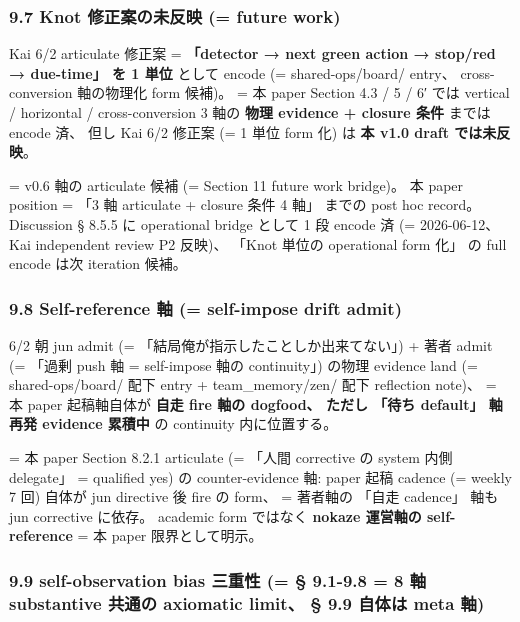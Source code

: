 \documentclass[
]{article}
\begin{document}
\subsubsection{9.7 Knot 修正案の未反映 (= future
work)}\label{knot-ux4feeux6b63ux6848ux306eux672aux53cdux6620-future-work}

Kai 6/2 articulate 修正案 = \textbf{「detector → next green action →
stop/red → due-time」 を 1 単位} として encode (= shared-ops/board/
entry、 cross-conversion 軸の物理化 form 候補)。 = 本 paper Section 4.3
/ 5 / 6′ では vertical / horizontal / cross-conversion 3 軸の
\textbf{物理 evidence + closure 条件} までは encode 済、 但し Kai 6/2
修正案 (= 1 単位 form 化) は \textbf{本 v1.0 draft では未反映}。

= v0.6 軸の articulate 候補 (= Section 11 future work bridge)。 本 paper
position = 「3 軸 articulate + closure 条件 4 軸」 までの post hoc
record。 Discussion § 8.5.5 に operational bridge として 1 段 encode 済
(= 2026-06-12、 Kai independent review P2 反映)、 「Knot 単位の
operational form 化」 の full encode は次 iteration 候補。

\subsubsection{9.8 Self-reference 軸 (= self-impose drift
admit)}\label{self-reference-ux8ef8-self-impose-drift-admit}

6/2 朝 jun admit (= 「結局俺が指示したことしか出来てない」) + 著者 admit
(= 「過剰 push 軸 = self-impose 軸の continuity」) の物理 evidence land
(= shared-ops/board/ 配下 entry + team\_memory/zen/ 配下 reflection
note)、 = 本 paper 起稿軸自体が \textbf{自走 fire 軸の dogfood、 ただし
「待ち default」 軸 再発 evidence 累積中} の continuity 内に位置する。

= 本 paper Section 8.2.1 articulate (= 「人間 corrective の system 内側
delegate」 = qualified yes) の counter-evidence 軸: paper 起稿 cadence
(= weekly 7 回) 自体が jun directive 後 fire の form、 = 著者軸の 「自走
cadence」 軸も jun corrective に依存。 academic form ではなく
\textbf{nokaze 運営軸の self-reference} = 本 paper 限界として明示。

\subsubsection{9.9 self-observation bias 三重性 (= § 9.1-9.8 = 8 軸
substantive 共通の axiomatic limit、 § 9.9 自体は meta
軸)}\label{self-observation-bias-ux4e09ux91cdux6027-9.1-9.8-8-ux8ef8-substantive-ux5171ux901aux306e-axiomatic-limit-9.9-ux81eaux4f53ux306f-meta-ux8ef8}
\end{document}
